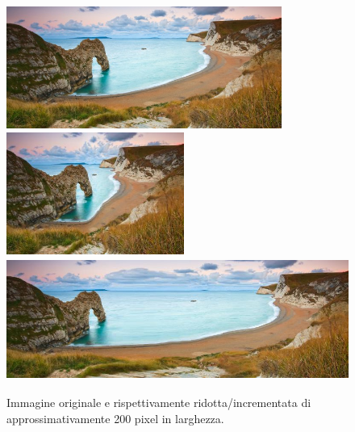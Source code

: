 \documentclass[12pt,a4paper]{report}
\theoremstyle{plain}
\theoremstyle{definition}
\begin{document}
\begin{figure}[h]
\centering
\includegraphics[height=4cm]{coast}
\includegraphics[height=4cm]{coastsmall}
\vskip 0.1cm
\includegraphics[height=4cm]{coastlarge}
\caption{Immagine originale e rispettivamente ridotta/incrementata di approssimativamente 200 pixel in larghezza.}
\label{preserve}
\end{figure} 
 
\end{document}
